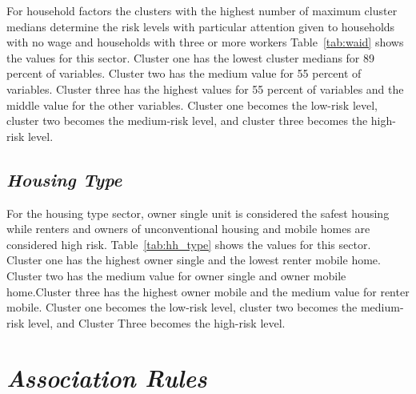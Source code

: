 For household factors the clusters with the highest number of maximum cluster medians determine the risk levels with particular attention given to households with no wage and households with three or more workers Table~\ref{tab:waid} shows the values for this sector. Cluster one has the lowest cluster medians for 89 percent of variables. Cluster two has the medium value for 55 percent of variables. Cluster three has the highest values for 55 percent of variables and the middle value for the other variables. Cluster one becomes the low-risk level, cluster two becomes the medium-risk level, and cluster three becomes the high-risk level.




\pagebreak


\subsection{\textit{Housing Type}}
For the housing type sector, owner single unit is considered the safest housing while renters and owners of unconventional housing and mobile homes are considered high risk. Table~\ref{tab:hh_type} shows the values for this sector. Cluster one has the highest owner single and the lowest renter mobile home. Cluster two has the medium value for owner single and owner mobile home.Cluster three has the highest owner mobile and the medium value for renter mobile.  Cluster one becomes the low-risk level, cluster two becomes the medium-risk level, and Cluster Three becomes the high-risk level.




\section{\textit{Association Rules}}

